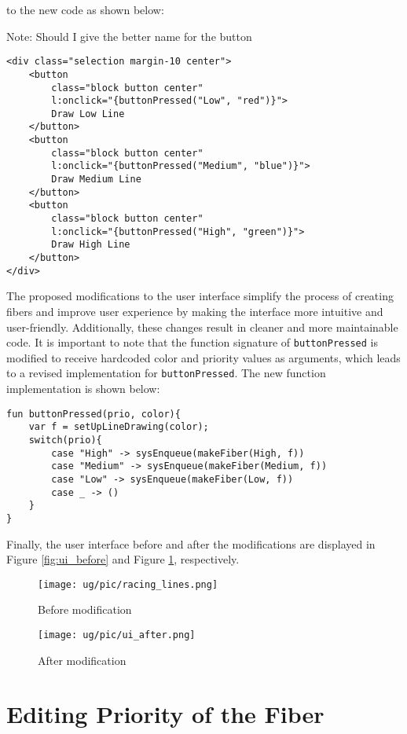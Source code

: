 \documentclass[logo,bsc,singlespacing,parskip]{infthesis}
\begin{document}
to the new code as shown below:

Note: Should I give the better name for the button
\begin{verbatim}
<div class="selection margin-10 center">
    <button 
        class="block button center" 
        l:onclick="{buttonPressed("Low", "red")}">
        Draw Low Line
    </button>
    <button 
        class="block button center" 
        l:onclick="{buttonPressed("Medium", "blue")}">
        Draw Medium Line
    </button>
    <button 
        class="block button center" 
        l:onclick="{buttonPressed("High", "green")}">
        Draw High Line
    </button>
</div>
\end{verbatim}

The proposed modifications to the user interface simplify the process of creating fibers and improve user experience by making the interface more intuitive and user-friendly. Additionally, these changes result in cleaner and more maintainable code.  It is important to note that the function signature of \texttt{buttonPressed} is modified to receive hardcoded color and priority values as arguments, which leads to a revised implementation for \texttt{buttonPressed}. The new function implementation is shown below:
\begin{verbatim}
fun buttonPressed(prio, color){
    var f = setUpLineDrawing(color);
    switch(prio){
        case "High" -> sysEnqueue(makeFiber(High, f))
        case "Medium" -> sysEnqueue(makeFiber(Medium, f))
        case "Low" -> sysEnqueue(makeFiber(Low, f))
        case _ -> ()
    }
}    
\end{verbatim}

Finally, the user interface before and after the modifications are displayed in Figure \ref{fig:ui_before} and Figure \ref{fig:ui_after}, respectively.

\begin{figure}[htbp]
\centering
\begin{minipage}[t]{0.48\textwidth}
\centering
\texttt{[image: ug/pic/racing\_lines.png]}
\caption{Before modification}
\label{fig:ui_before}
\end{minipage}
\begin{minipage}[t]{0.48\textwidth}
\centering
\texttt{[image: ug/pic/ui\_after.png]}
\caption{After modification}
\label{fig:ui_after}
\end{minipage}
\end{figure}

\section{Editing Priority of the Fiber}
\label{section:edit_prio}
\end{document}
